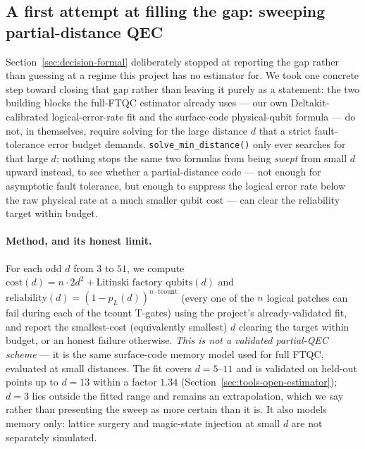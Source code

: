 \documentclass[9pt,twocolumn]{extarticle}
\begin{document}
\subsection{A first attempt at filling the gap: sweeping partial-distance QEC}
\label{sec:partial-qec}
Section~\ref{sec:decision-formal} deliberately stopped at reporting the
gap rather than guessing at a regime this project has no estimator for.
We took one concrete step toward closing that gap rather than leaving it
purely as a statement: the two building blocks the full-FTQC estimator
already uses --- our own Deltakit-calibrated logical-error-rate
fit and the surface-code physical-qubit formula --- do not, in
themselves, require solving for the large distance $d$ that a strict
fault-tolerance error budget demands. \texttt{solve\_min\_distance()}
only ever searches for that large $d$; nothing stops the same two
formulas from being \emph{swept} from small $d$ upward instead, to see
whether a partial-distance code --- not enough for asymptotic fault
tolerance, but enough to suppress the logical error rate below the raw
physical rate at a much smaller qubit cost --- can clear the reliability
target within budget.

\paragraph{Method, and its honest limit.} For each odd $d$ from $3$ to
$51$, we compute $\text{cost}(d) = n\cdot 2d^2 + \text{Litinski
factory qubits}(d)$ and $\text{reliability}(d) = (1-p_L(d))^{n\cdot\text{tcount}}$ (every one
of the $n$ logical patches can fail during each of the tcount T-gates)
using the project's already-validated fit, and report the smallest-cost
(equivalently smallest) $d$ clearing the target within budget, or an
honest failure otherwise. \emph{This is not a validated partial-QEC
scheme} --- it is the same surface-code memory model used for full FTQC,
evaluated at small distances. The fit covers $d=5$--$11$ and is validated on
held-out points up to $d=13$ within a factor $1.34$
(Section~\ref{sec:tools-open-estimator}); $d=3$ lies outside the fitted
range and remains an extrapolation, which we say rather than presenting the
sweep as more certain than it is. It also models memory only: lattice
surgery and magic-state injection at small $d$ are not separately
simulated.
\end{document}
